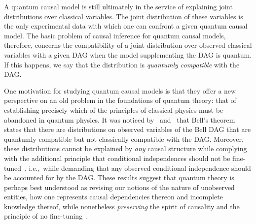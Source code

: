 \documentclass[aps,english,superscriptaddress,onecolumn,twoside,longbibliography,pra,floatfix,fleqn,nofootinbib]{revtex4-1}%
\theoremstyle{definition}
\begin{document}
A quantum causal model is still ultimately in the service of explaining joint distributions over classical variables. The joint distribution of these variables is the only experimental data with which one can confront a given quantum causal model. The basic problem of causal inference for quantum causal models, therefore, concerns the compatibility of a joint distribution over observed classical variables with a given DAG when the model supplementing the DAG is quantum. If this happens, we say that the distribution is {\em quantumly compatible} with the DAG.  
 

One motivation for studying quantum causal models is that they offer a new perspective on an old  problem in the foundations of quantum theory: that of establishing precisely which of the principles of classical physics must be abandoned in quantum physics. It was noticed by~\citet{fritz2012bell} and~\citet{WoodSpekkens} that Bell's theorem~\cite{bell1966lhvm} states that there are distributions on observed variables of the Bell DAG that are quantumly compatible but not classically compatible with the DAG. Moreover, these distributions cannot be explained by \emph{any} causal structure while complying with the additional principle that conditional independences should not be fine-tuned~\cite{WoodSpekkens}, i.e.,~while demanding that any observed conditional independence should be accounted for by the DAG. These results suggest that quantum theory is perhaps best understood as revising our notions of the nature of unobserved entities, how one represents causal dependencies thereon and incomplete knowledge thereof, while 
nonetheless {\em preserving} the spirit of causality and the principle of no fine-tuning~\cite{leifer2013conditionalstates,Spekkens2015paradigm,henson2011ontic}.
\end{document}
